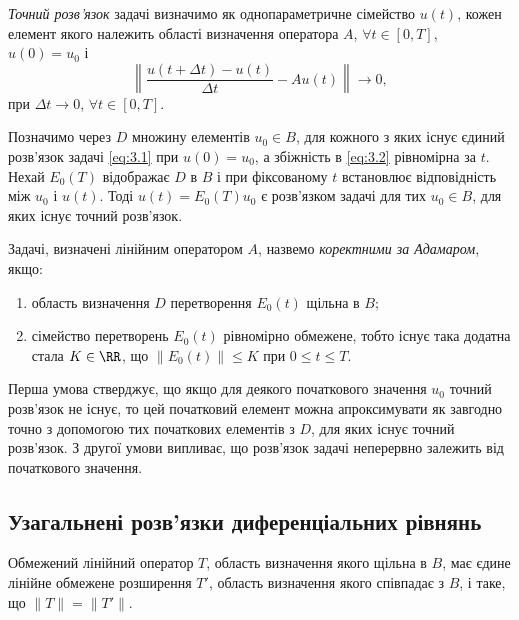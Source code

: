 \begin{definition}
    \textit{Точний розв'язок} задачі визначимо як однопараметричне сімейство $u(t)$, кожен елемент якого належить області визначення оператора $A$, $\forall t \in [0, T]$, $u(0) = u_0$ і
    \begin{equation}
        \label{eq:3.2}
        \left\| \frac{u(t + \Delta t) - u(t)}{\Delta t} - A u(t) \right\| \to 0,
    \end{equation}
    при $\Delta t \to 0$, $\forall t \in [0, T]$.
\end{definition}

Позначимо через $D$ множину елементів $u_0 \in B$, для кожного з яких існує єдиний розв'язок задачі \eqref{eq:3.1} при $u(0) = u_0$, а збіжність в \eqref{eq:3.2} рівномірна за $t$. Нехай $E_0(T)$ відображає $D$ в $B$ і при фіксованому $t$ встановлює відповідність між $u_0$ і $u(t)$. Тоді $u(t) = E_0(T) u_0$ є розв'язком задачі для тих $u_0 \in B$, для яких існує точний розв'язок.

\begin{definition}
    Задачі, визначені лінійним оператором $A$, назвемо \textit{коректними за Адамаром}, якщо: 
    \begin{enumerate}
        \item область визначення $D$ перетворення $E_0(t)$ щільна в $B$;
        \item сімейство перетворень $E_0(t)$ рівномірно обмежене, тобто існує така додатна стала $K \in \RR$, що $\|E_0(t)\| \le K$ при $0 \le t \le T$. 
    \end{enumerate}
\end{definition}

Перша умова стверджує, що якщо для деякого початкового значення $u_0$ точний розв'язок не існує, то цей початковий елемент можна апроксимувати як завгодно точно з допомогою тих початкових елементів з $D$, для яких існує точний розв'язок. З другої умови випливає, що розв'язок задачі неперервно залежить від початкового значення. 

\subsection{Узагальнені розв'язки диференціальних рівнянь}

\begin{theorem}%
    Обмежений лінійний оператор $T$, область визначення якого щільна в $B$, має єдине лінійне обмежене розширення $T'$, область визначення якого співпадає з $B$, і таке, що $\|T\| = \|T'\|$.
\end{theorem}

